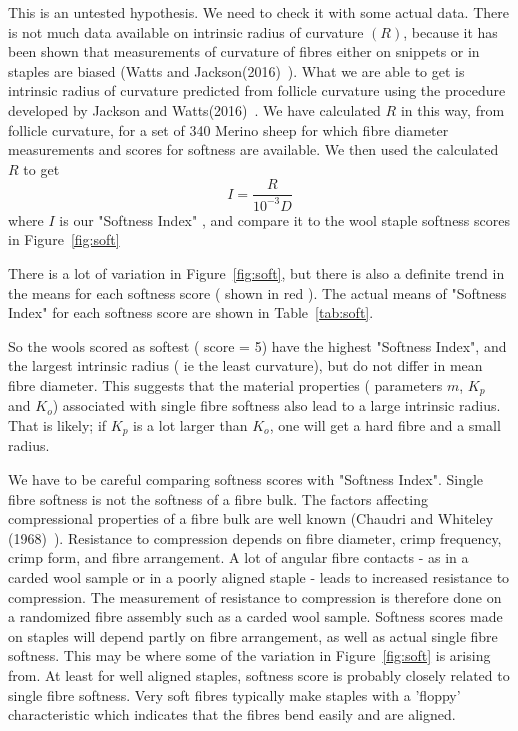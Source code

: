\documentclass[titlepage]{article}  %
\begin{document}
This is an untested  hypothesis. We need to check it with some actual data. There is not much data available on intrinsic radius of curvature $(R)$, because it has been shown that measurements of curvature of fibres either on snippets or in staples are biased (Watts and Jackson(2016)~\cite{watt:16}). What we are able to get is intrinsic radius of curvature predicted from follicle curvature using the procedure developed by Jackson and Watts(2016)~\cite{jack:16b}. We have calculated $R$ in this way, from follicle curvature, for a set of 340 Merino sheep for which fibre diameter measurements and scores for softness are available.
We then used the calculated $R$ to get
\begin{displaymath}
I = \frac{R}{10^{-3}D}
\end{displaymath}
where $I$ is our "Softness Index" , and compare it to the wool staple softness scores in Figure~\ref{fig:soft}

 There is a lot of variation in Figure~\ref{fig:soft}, but there is also a definite trend in the means for each softness score ( shown in red ). The actual means of "Softness Index" for each softness score are shown in Table~\ref{tab:soft}.

So the wools scored as softest ( score = 5) have the highest "Softness Index", and the largest intrinsic radius ( ie the least curvature), but do not differ in mean fibre diameter. This suggests that the material properties ( parameters $m$, $K_{p}$ and $K_{o}$) associated with single fibre softness also lead to a large intrinsic radius. That is likely; if $K_{p}$ is a lot larger than $K_{o}$, one will get a hard fibre and a small radius.

We have to be careful comparing softness scores with "Softness Index". Single fibre softness is not the softness of a fibre bulk. The factors affecting compressional properties of a fibre bulk are well known (Chaudri and Whiteley (1968)~\cite{chau:68}). Resistance to compression depends on fibre diameter, crimp frequency, crimp form, and fibre arrangement. A lot of angular fibre contacts - as in a carded wool sample or in a poorly aligned staple -  leads to increased resistance to compression. The measurement of resistance to compression is therefore done on a randomized fibre assembly such as a carded wool sample. Softness scores made on staples will depend partly on fibre arrangement, as well as actual single fibre softness. This may be where some of the variation in Figure~\ref{fig:soft} is arising from. At least for well aligned staples, softness score is probably closely related to single fibre softness. Very soft fibres typically make staples with a 'floppy' characteristic which indicates that the fibres bend easily and are aligned.
\end{document}
